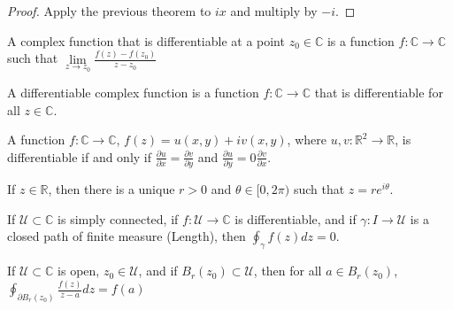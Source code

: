             \begin{proof}
            Apply the previous theorem to $ix$ and multiply by $-i$.
            \end{proof}
            \begin{definition}
            A complex function that is differentiable at a point $z_{0}\in\mathbb{C}$ is a function $f:\mathbb{C}\rightarrow\mathbb{C}$ such that $\underset{z\rightarrow z_{0}}{\lim}\frac{f(z)-f(z_{0})}{z-z_{0}}$
            \end{definition}
            \begin{definition}
            A differentiable complex function is a function $f:\mathbb{C}\rightarrow\mathbb{C}$ that is differentiable for all $z\in\mathbb{C}$.
            \end{definition}
            \begin{theorem}
            A function $f:\mathbb{C}\rightarrow\mathbb{C}$, $f(z)=u(x,y)+iv(x,y)$, where $u,v:\mathbb{R}^{2}\rightarrow \mathbb{R}$, is differentiable if and only if $\frac{\partial u}{\partial x}=\frac{\partial v}{\partial y}$ and $\frac{\partial u}{\partial y} = 0\frac{\partial v}{\partial x}$.
            \end{theorem}
            \begin{theorem}
            If $z\in\mathbb{R}$, then there is a unique $r>0$ and $\theta\in[0,2\pi)$ such that $z=re^{i\theta}$.
            \end{theorem}
            \begin{theorem}
            If $\mathcal{U}\subset\mathbb{C}$ is simply connected, if $f:\mathcal{U}\rightarrow \mathbb{C}$ is differentiable, and if $\gamma:I\rightarrow \mathcal{U}$ is a closed path of finite measure (Length), then $\oint_{\gamma}f(z)dz = 0$.
            \end{theorem}
            \begin{theorem}
            If $\mathcal{U}\subset\mathbb{C}$ is open, $z_{0}\in\mathcal{U}$, and if $B_{r}(z_{0})\subset\mathcal{U}$, then for all $a\in B_{r}(z_{0})$, $\oint_{\partial B_{r}(z_{0})}\frac{f(z)}{z-a}dz = f(a)$
            \end{theorem}
